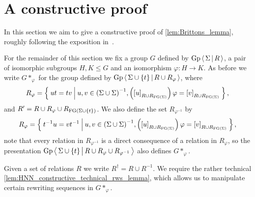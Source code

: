 
\section{A constructive proof}

In this section we aim to give a constructive proof of \cref{lem:Brittons_lemma}, roughly
following the exposition in~\cite[Section 6.3]{Bokut1994aa}.

For the remainder of this section we fix a group $G$ defined by
$\textrm{Gp}\left\langle\, \Sigma \,\middle|\, R \,\right\rangle$, a pair of isomorphic subgroups $H, K\leq G$ and an isomorphism $\varphi: H\rightarrow K$.
As before we write $G\ast_\varphi$ for the group defined by
$\textrm{Gp}\left\langle\, \Sigma \cup \{t\} \,\middle|\, R\cup R_\varphi \,\right\rangle$, where
\[
  R_\varphi = \left\{\: ut = tv \: \middle|\: 
    u, v \in {(\Sigma \cup \Sigma)}^{-1},
    \left({[u]}_{R\cup R_{\textrm{FG}(\Sigma)}}\right)\varphi = {[v]}_{R\cup R_{\textrm{FG}(\Sigma)}}
   \:\right\},
\]
and $R^\prime = R\cup R_\varphi \cup R_{\textrm{FG}(\Sigma \cup \{t\})}$. We also define the set $R_{\varphi^{-1}}$ by
\[
  R_\varphi = \left\{\: t^{-1}u = vt^{-1} \: \middle|\: 
    u, v \in {(\Sigma \cup \Sigma)}^{-1},
    \left({[u]}_{R\cup R_{\textrm{FG}(\Sigma)}}\right)\varphi = {[v]}_{R\cup R_{\textrm{FG}(\Sigma)}}
   \:\right\},
\]
note that every relation in $R_{\varphi^{-1}}$ is a direct consequence of a relation in
$R_\varphi$, so the presentation $\textrm{Gp}\left\langle\, \Sigma \cup \{t\} \,\middle|\, R \cup R_\varphi \cup
R_{\varphi^{-1}} \,\right\rangle$ also defines $G\ast_\varphi$.

Given a set of relations $R$ we write $R^\dagger = R\cup R^{-1}$.
We require the rather technical \cref{lem:HNN_constructive_technical_rws_lemma}, which allows us
to manipulate certain rewriting sequences in $G\ast_\varphi$.

